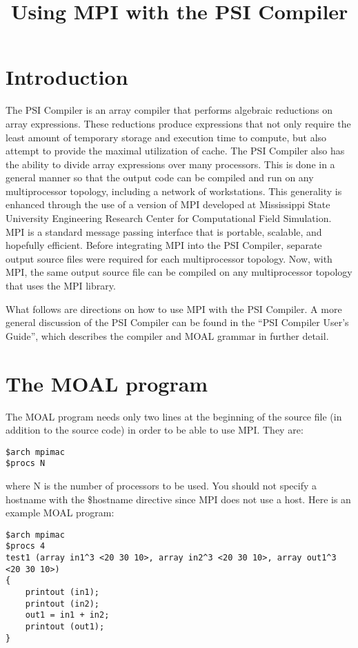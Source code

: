 
\title{Using MPI with the PSI Compiler}
\author{}
\date{}


\maketitle

\section{Introduction}
The PSI Compiler is an array compiler that performs algebraic reductions on 
array expressions.  These reductions produce expressions that not only require
the least amount of temporary storage and execution time to compute, but also
attempt to provide the maximal utilization of cache.  The PSI Compiler also
has the ability to divide array expressions over many processors.  This is
done in a general manner so that the output code can be compiled and run on
any multiprocessor topology, including a network of workstations.  This
generality is enhanced through the use of a version of MPI developed at
Mississippi State University Engineering Research Center for Computational
Field Simulation.  MPI is a standard message passing interface that is
portable, scalable, and hopefully efficient.  Before integrating MPI into
the PSI Compiler, separate output source files were required for each
multiprocessor topology.  Now, with MPI, the same output source file can be
compiled on any multiprocessor topology that uses the MPI library.  

What follows are directions on how to use MPI with the PSI Compiler. 
A more general discussion of the PSI Compiler can be found in the ``PSI
Compiler User's Guide'', which describes the compiler and MOAL grammar
in further detail.

\section{The MOAL program}
The MOAL program needs only two lines at the beginning of the source file
(in addition to the source code) in order to be able to use MPI.  They are:
{\samepage
\begin{verbatim}
$arch mpimac
$procs N
\end{verbatim}
}
where N is the number of processors to be used.  You should not specify a
hostname with the \$hostname directive since MPI does not use a host.  Here
is an example MOAL program:
{\samepage
\begin{verbatim}
$arch mpimac
$procs 4
test1 (array in1^3 <20 30 10>, array in2^3 <20 30 10>, array out1^3 <20 30 10>)
{
    printout (in1);
    printout (in2);
    out1 = in1 + in2;
    printout (out1);
}
\end{verbatim}
}
